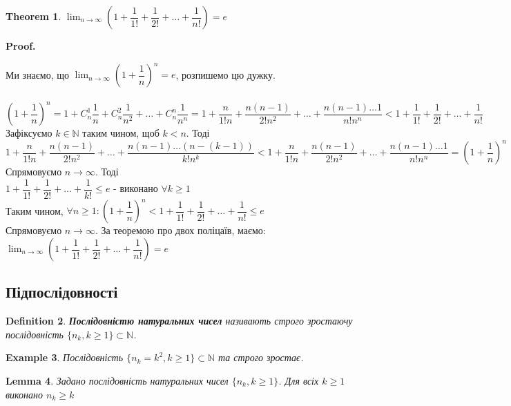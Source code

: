 \documentclass[a4paper, 14pt]{article}
\makeatletter
\def\qed{$\blacksquare$}
\theoremstyle{theoremdd}
\newtheorem{theorem}{Theorem}[subsection]
\theoremstyle{theoremdd}
\newtheorem{definition}[theorem]{Definition}
\theoremstyle{theoremdd}
\theoremstyle{theoremdd}
\newtheorem{example}[theorem]{Example}
\theoremstyle{theoremdd}
\theoremstyle{theoremdd}
\theoremstyle{theoremdd}
\newtheorem{lemma}[theorem]{Lemma}
\theoremstyle{theoremdd}
\renewenvironment{proof}[1][Proof.\\]{\par
\pushQED{\hfill \qed}%
\normalfont \topsep6\p@\@plus6\p@\relax
\trivlist
\item\relax
{\bfseries
#1\@addpunct{.}}\hspace\labelsep\ignorespaces
}{%
\popQED\endtrivlist\@endpefalse
}
\makeatother
\begin{document}
	\begin{theorem}
	$\displaystyle \lim_{n \to \infty} \left( 1 + \dfrac{1}{1!} + \dfrac{1}{2!} + \dots + \dfrac{1}{n!} \right) = e$
	\end{theorem}
	
	\begin{proof}
	Ми знаємо, що $\displaystyle \lim_{n \to \infty} \left( 1 + \dfrac{1}{n} \right)^n = e$, розпишемо цю дужку.\\\
	$\left( 1 + \dfrac{1}{n} \right)^n = 1 + C_n^1 \dfrac{1}{n} + C_n^2 \dfrac{1}{n^2} + \dots + C_n^n \dfrac{1}{n^n} = 1 + \dfrac{n}{1!n} + \dfrac{n(n-1)}{2! n^2} + \dots + \dfrac{n(n-1)\dots 1}{n! n^n} < 1 + \dfrac{1}{1!} + \dfrac{1}{2!} + \dots + \dfrac{1}{n!}$\\
	Зафіксуємо $k \in \mathbb{N}$ таким чином, щоб $k < n$. Тоді\\
	$1 + \dfrac{n}{1!n} + \dfrac{n(n-1)}{2!n^2} + \dots + \dfrac{n(n-1)\dots(n-(k-1))}{k!n^k} < 1 + \dfrac{n}{1!n} + \dfrac{n(n-1)}{2! n^2} + \dots + \dfrac{n(n-1)\dots 1}{n! n^n} = \left( 1 + \dfrac{1}{n} \right)^n$\\
	Спрямовуємо $n \to \infty$. Тоді\\
	$1 + \dfrac{1}{1!} + \dfrac{1}{2!} + \dots + \dfrac{1}{k!} \leq e$ - виконано $\forall k \geq 1$\\
	Таким чином, $\forall n \geq 1: \left(1 + \dfrac{1}{n} \right)^n < 1 + \dfrac{1}{1!} + \dfrac{1}{2!} + \dots + \dfrac{1}{n!} \leq e$\\
	Спрямовуємо $n \to \infty$. За теоремою про двох поліцаїв, маємо:\\
	$\displaystyle \lim_{n \to \infty} \left( 1 + \dfrac{1}{1!} + \dfrac{1}{2!} + \dots + \dfrac{1}{n!} \right) = e$
	\end{proof}
	
	\subsection{Підпослідовності}
	\begin{definition}
	\textbf{Послідовністю натуральних чисел} називають строго зростаючу послідовність $\{n_k, k \geq 1\} \subset \mathbb{N}$.
	\end{definition}
	
	\begin{example}
	Послідовність $\{n_k = k^2, k \geq 1\} \subset \mathbb{N}$ та строго зростає.
	\end{example}
	
	\begin{lemma}
	Задано послідовність натуральних чисел $\{n_k, k \geq 1\}$. Для всіх $k \geq 1$ виконано $n_k \geq k$
	\end{lemma}
	
\end{document}
